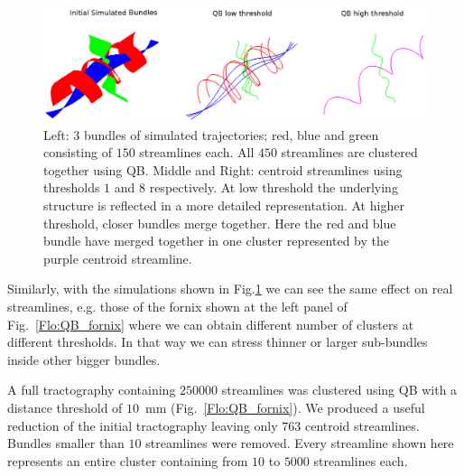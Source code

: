 \documentclass{bioinfo}
\begin{document}
\begin{figure}
\begin{centering}
\includegraphics[width=160mm]{Figures/Fig_5_helix_phantom}
\par\end{centering}
\caption{Left: $3$ bundles of simulated trajectories; red, blue and
  green consisting of $150$ streamlines each. All $450$ streamlines are
  clustered together using QB. Middle and Right: centroid streamlines
  using thresholds $1$ and $8$ respectively.  At low threshold the
  underlying structure is reflected in a more detailed
  representation. At higher threshold, closer bundles merge
  together. Here the red and blue bundle have merged together in one
  cluster represented by the purple centroid
  streamline.\label{Flo:simulated_orbits}}
\end{figure}

Similarly, with the simulations shown in Fig.\ref{Flo:simulated_orbits}
we can see the same effect on real streamlines, e.g. those of the fornix
shown at the left panel of Fig.~\ref{Flo:QB_fornix} where we can obtain
different number of clusters at different thresholds. In that way we can
stress thinner or larger sub-bundles inside other bigger bundles.

A full tractography containing $\num{250000}$ streamlines was clustered
using QB with a distance threshold of $10$~mm
(Fig.~\ref{Flo:QB_fornix}).  We produced a useful reduction of the
initial tractography leaving only $763$ centroid streamlines. Bundles
smaller than $10$ streamlines were removed. Every streamline shown here
represents an entire cluster containing from $10$ to $\num{5000}$
streamlines each.
\end{document}
